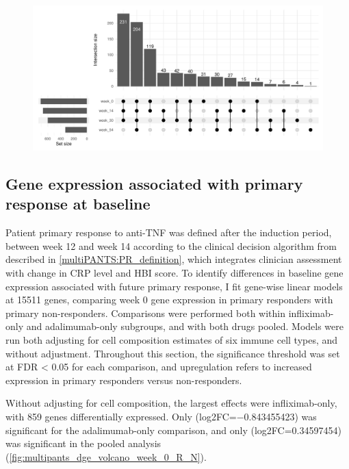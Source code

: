 \begin{outline}
\begin{figure}
    \centering
    \includegraphics[width=1.0\textwidth,page=1]{mainmatter/figures/chapter_04/process_pheno.pheno_filtered_dge.Visit_Label_upset.pdf}
    \caption{}
    \label{fig:multipants_visits_upset}
\end{figure}



\subsection{Gene expression associated with primary response at baseline}

Patient primary response to anti-\gls{TNF} was defined after the induction period, between week 12 and week 14 according to the clinical decision algorithm from \textcite{kennedy2019PredictorsAntiTNFTreatment} described in \autoref{multiPANTS:PR_definition}, 
which integrates clinician assessment with change in \gls{CRP} level and \gls{HBI} score.
To identify differences in baseline gene expression associated with future primary response, 
I fit gene-wise linear models at 15511 genes, comparing week 0 gene expression in primary responders with primary non-responders.
Comparisons were performed both within infliximab-only and adalimumab-only subgroups, and with both drugs pooled.
Models were run both adjusting for cell composition estimates of six immune cell types, and without adjustment.
Throughout this section, the significance threshold was set at FDR < 0.05 for each comparison, and upregulation refers to increased expression in primary responders versus non-responders.

Without adjusting for cell composition, the largest effects were infliximab-only, with 859 genes differentially expressed.
Only  (log2FC=\num{-0.843455423}) was significant for the adalimumab-only comparison, 
and only  (log2FC=\num{0.34597454}) was significant in the pooled analysis (\autoref{fig:multipants_dge_volcano_week_0_R_N}).


\end{outline}
